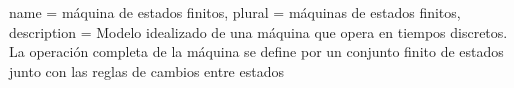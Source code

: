 {
  name = máquina de estados finitos,
  plural = máquinas de estados finitos,
  description = {
   Modelo idealizado de una máquina que opera en tiempos discretos. La operación
   completa de la máquina se define por un conjunto finito de estados junto con
   las reglas de cambios entre estados \cite{minsky}%
  }
}

\glsaddall
